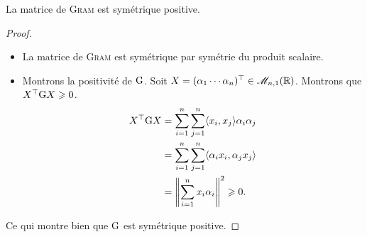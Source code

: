 \begin{tcolorbox}
    La matrice de \textsc{Gram} est symétrique positive.
\end{tcolorbox}

\begin{proof} \\

    \begin{itemize}
        \item La matrice de \textsc{Gram} est symétrique par symétrie du produit scalaire.
        \item Montrons la positivité de $\mathrm{G}$. Soit $X = (\alpha_1 \cdots \alpha_n)^\top \in \mathscr{M}_{n,1}(\mathbb{R})$. Montrons que $X^\top \mathrm{G} X \geqslant 0$. 
        \begin{align*}
            X^\top \mathrm{G} X &= \sum_{i=1}^{n} \sum_{j=1}^{n} \langle x_i, x_j \rangle \alpha_i \alpha_j \\ 
            &= \sum_{i=1}^{n} \sum_{j=1}^{n} \langle \alpha_i x_i, \alpha_j x_j \rangle \\
            &= \left\Vert \sum_{i=1}^{n}x_i \alpha_i \right\Vert^2 \geqslant 0.
        \end{align*}
    \end{itemize}
   
    Ce qui montre bien que $\mathrm{G}$ est symétrique positive.
\end{proof}

